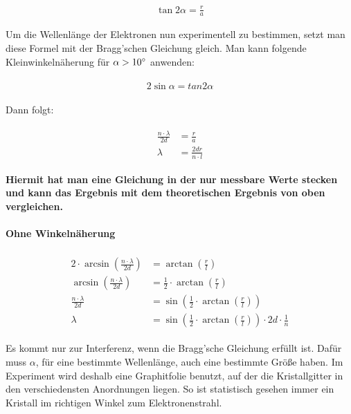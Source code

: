 \begin{align}
	\tan{2\alpha} = \frac{r}{a}
\end{align}

Um die Wellenlänge der Elektronen nun experimentell zu bestimmen, setzt man diese Formel mit der Bragg'schen Gleichung gleich. Man kann folgende Kleinwinkelnäherung für $\alpha > 10\degree$ anwenden:

\begin{align}
\begin{split}
	2\sin{\alpha} = tan{2\alpha}
\end{split}
\end{align}

\noindent Dann folgt:

\begin{align}
\begin{split}
	\frac{n\cdot\lambda}{2d} &= \frac{r}{a} \\
	\lambda &= \frac{2dr}{n\cdot l}
\end{split}
\end{align}

\noindent \textbf{Hiermit hat man eine Gleichung in der nur messbare Werte stecken und kann das Ergebnis mit dem theoretischen Ergebnis von oben vergleichen.}

\paragraph{Ohne Winkelnäherung}

\begin{align}
\begin{split}
	2\cdot\arcsin(\frac{n\cdot \lambda}{2d}) &= \arctan(\frac{r}{l})  \\
	\arcsin(\frac{n\cdot \lambda}{2d}) &= \frac{1}{2}\cdot\arctan(\frac{r}{l}) \\
	\frac{n\cdot \lambda}{2d} &= \sin(\frac{1}{2}\cdot\arctan(\frac{r}{l})) \\
	\lambda &= \sin(\frac{1}{2}\cdot\arctan(\frac{r}{l}))\cdot 2d \cdot \frac{1}{n}
\end{split}
\end{align}

\begin{NiceToKnow}
Es kommt nur zur Interferenz, wenn die Bragg'sche Gleichung erfüllt ist. Dafür muss $\alpha$, für eine bestimmte Wellenlänge, auch eine bestimmte Größe haben. Im Experiment wird deshalb eine Graphitfolie benutzt, auf der die Kristallgitter in den verschiedensten Anordnungen liegen. So ist statistisch gesehen immer ein Kristall im richtigen Winkel zum Elektronenstrahl.
\end{NiceToKnow}


